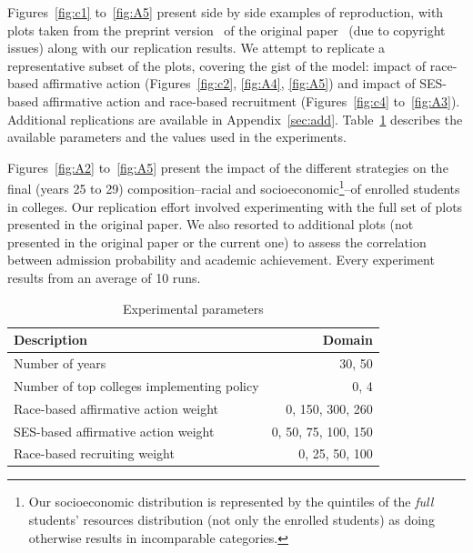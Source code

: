 Figures~\ref{fig:c1} to~\ref{fig:A5} present side by side examples of reproduction, with plots taken from the preprint version~\cite{reardon2018levels_preprint} of the original paper~\cite{reardon2018levels} (due to copyright issues) along with our replication results. %
We attempt to replicate a representative subset of the plots, covering the gist of the model: impact of race-based affirmative action (Figures~\ref{fig:c2}, \ref{fig:A4}, \ref{fig:A5}) and impact of SES-based affirmative action and race-based recruitment (Figures~\ref{fig:c4} to~\ref{fig:A3}). %
Additional replications are available in Appendix~\ref{sec:add}.
Table~\ref{tab:exp} describes the available parameters and the values used in the experiments.

Figures~\ref{fig:A2} to~\ref{fig:A5} present the impact of the different strategies on the final (years 25 to 29) composition--racial and socioeconomic\footnote{Our socioeconomic distribution is represented by the quintiles of the \emph{full} students' resources distribution (not only the enrolled students) as doing otherwise results in incomparable categories.}--of enrolled students in colleges. %
Our replication effort involved experimenting with the full set of plots presented in the original paper.
We also resorted to additional plots (not presented in the original paper or the current one) to assess the correlation between admission probability and academic achievement.
Every experiment results from an average of 10 runs.

\begin{table}[!ht]
    \centering
    \begin{tabular}{l r} \toprule
        \textbf{Description} & \textbf{Domain} \\ \midrule
        Number of years & 30, 50 \\
        Number of top colleges implementing policy & 0, 4 \\
        Race-based affirmative action weight & 0, 150, 300, 260 \\
        SES-based affirmative action weight & 0, 50, 75, 100, 150 \\
        Race-based recruiting weight & 0, 25, 50, 100 \\ \bottomrule
    \end{tabular}
    \caption{Experimental parameters}
    \label{tab:exp}
\end{table}


